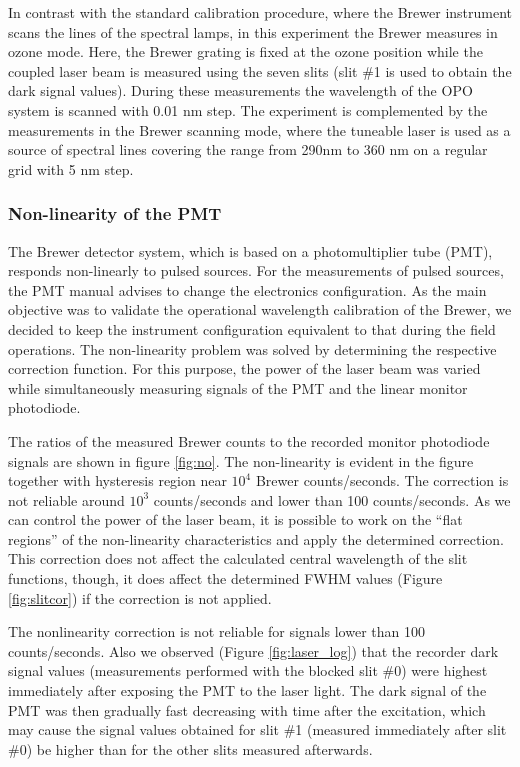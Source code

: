 \documentclass[acp, manuscript]{copernicus}
\begin{document}


In contrast with the standard calibration procedure, where the Brewer instrument scans the lines of the spectral lamps, in this experiment the Brewer measures in ozone mode. Here, the Brewer grating is fixed at the ozone position while the coupled laser beam is measured using the seven slits (slit  \#1 is used to obtain the dark signal values). During these measurements the wavelength of the OPO system is scanned with 0.01 \unit{nm} step. The experiment is complemented by the measurements in the Brewer scanning mode, where the tuneable laser is used as a source of spectral lines covering the range from 290\unit{nm} to 360 \unit{nm} on a regular grid with 5 \unit{nm} step.



\subsubsection{Non-linearity of the PMT }

The Brewer detector system, which is based on a photomultiplier tube (PMT), responds non-linearly to pulsed sources. For the measurements of pulsed sources, the PMT manual advises to change the electronics configuration. As the main objective was to validate the operational wavelength calibration of the Brewer, we decided to keep the instrument configuration equivalent to that during the field operations. The non-linearity problem was solved by determining the respective correction function. For this purpose, the power of the laser beam was varied while simultaneously measuring signals of the PMT and the linear monitor photodiode.


The ratios of the measured Brewer counts to the recorded monitor photodiode signals are shown in figure  \ref{fig:no}. The non-linearity is evident in the figure together with hysteresis region near $10^4$  Brewer counts/seconds. The correction is not reliable  around $10^3$ counts/seconds and lower than 100 counts/seconds. As we can control the power of the laser beam, it is possible to work on the “flat regions” of the non-linearity characteristics and apply the determined correction. This correction does not affect the calculated central wavelength of the slit functions, though, it does affect the determined FWHM values (Figure \ref{fig:slitcor}) if the correction is not applied.

The nonlinearity correction is not reliable for signals lower than 100 counts/seconds. Also we observed (Figure \ref{fig:laser_log}) that the recorder dark signal values (measurements performed with the blocked slit \#0) were highest immediately after exposing the PMT to the laser light. The dark signal of the PMT was then gradually fast decreasing with time after the excitation, which may cause the signal values obtained for slit \#1 (measured immediately after slit \#0) be higher than for the other slits measured afterwards.
\end{document}
